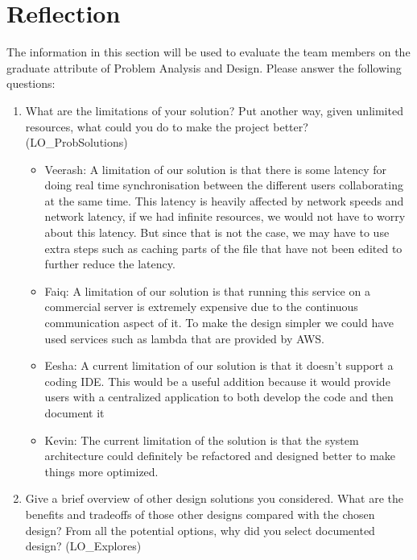 \documentclass[12pt, titlepage]{article}
\begin{document}
	\section{Reflection}
	
	The information in this section will be used to evaluate the team members on the
	graduate attribute of Problem Analysis and Design.  Please answer the following questions:
	
	\begin{enumerate}
		\item What are the limitations of your solution?  Put another way, given
		unlimited resources, what could you do to make the project better? (LO\_ProbSolutions)
		
		\begin{itemize}
			\item Veerash: A limitation of our solution is that there is some latency for doing real time synchronisation between the different users collaborating at the same time. This latency is heavily affected by network speeds and network latency, if we had infinite resources, we would not have to worry about this latency. But since that is not the case, we may have to use extra steps such as caching parts of the file that have not been edited to further reduce the latency.
			\item Faiq: A limitation of our solution is that running this service on a commercial server is extremely expensive due to the continuous communication aspect of it. To make the design simpler we could have used services such as lambda that are provided by AWS.
			\item Eesha: A current limitation of our solution is that it doesn't support a coding IDE. This would be a useful addition because it would provide users with a centralized application to both develop the code and then document it
			\item Kevin: The current limitation of the solution is that the system architecture could definitely be refactored and designed better to make things more optimized. 
			
		\end{itemize}
		
		
		\item Give a brief overview of other design solutions you considered.  What
		are the benefits and tradeoffs of those other designs compared with the chosen
		design?  From all the potential options, why did you select documented design?
		(LO\_Explores)
		

\end{enumerate}
\end{document}
